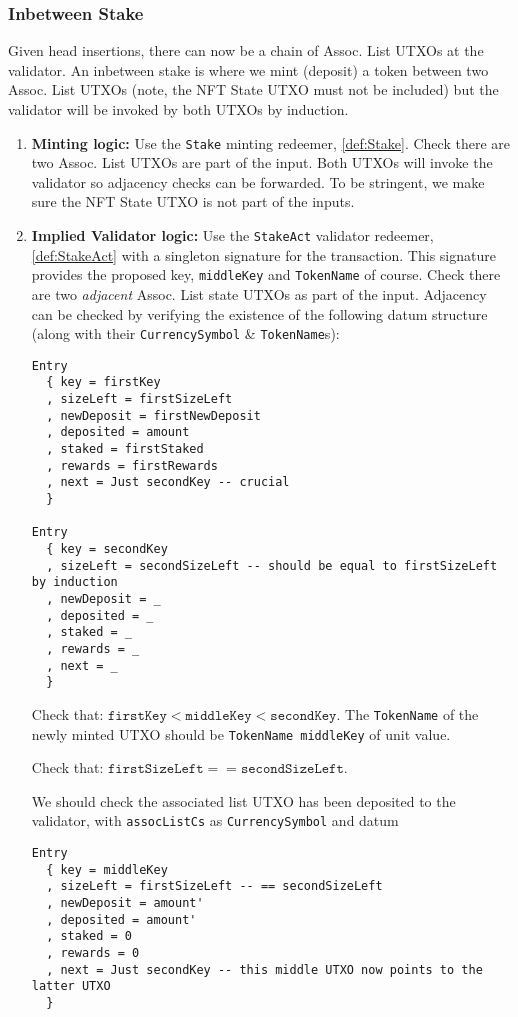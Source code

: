\documentclass[10pt, a4paper]{article}
\theoremstyle{definition}
\begin{document}
\subsubsection{Inbetween Stake}\label{subsubsection:InbetweenStake}
Given head insertions, there can now be a chain of Assoc. List  UTXOs at the validator. An inbetween stake is where we mint (deposit) a token between two Assoc. List UTXOs (note, the NFT State UTXO must not be included) but the validator will be invoked by both UTXOs by induction.
\begin{enumerate}
\item{\textbf{Minting logic:} Use the \texttt{Stake} minting redeemer, \ref{def:Stake}. Check there are two Assoc. List UTXOs are part of the input. Both UTXOs will invoke the validator so adjacency checks can be forwarded. To be stringent, we make sure the NFT State UTXO is not part of the inputs.
}

\item{\textbf{Implied Validator logic:} Use the \texttt{StakeAct} validator redeemer, \ref{def:StakeAct} with a singleton signature for the transaction. This signature provides the proposed key, \texttt{middleKey} and \texttt{TokenName} of course. Check there are two \textit{adjacent} Assoc. List state UTXOs as part of the input. Adjacency can be checked by verifying the existence of the following datum structure (along with their \texttt{CurrencySymbol} \& \texttt{TokenName}s):
\begin{verbatim}
Entry
  { key = firstKey
  , sizeLeft = firstSizeLeft
  , newDeposit = firstNewDeposit
  , deposited = amount
  , staked = firstStaked 
  , rewards = firstRewards 
  , next = Just secondKey -- crucial
  }

Entry
  { key = secondKey
  , sizeLeft = secondSizeLeft -- should be equal to firstSizeLeft by induction
  , newDeposit = _
  , deposited = _
  , staked = _ 
  , rewards = _
  , next = _
  }
\end{verbatim}

Check that:  $\texttt{firstKey} < \texttt{middleKey} < \texttt{secondKey}.$ The \texttt{TokenName} of the newly minted UTXO should be \texttt{TokenName middleKey} of unit value.

Check that: $\texttt{firstSizeLeft} == \texttt{secondSizeLeft}$.

 We should check the associated list UTXO has been deposited to the validator, with \texttt{assocListCs} as \texttt{CurrencySymbol} and datum
\begin{verbatim}
Entry
  { key = middleKey
  , sizeLeft = firstSizeLeft -- == secondSizeLeft
  , newDeposit = amount'
  , deposited = amount'
  , staked = 0 
  , rewards = 0
  , next = Just secondKey -- this middle UTXO now points to the latter UTXO
  }
\end{verbatim}

}
\end{enumerate}
\end{document}
